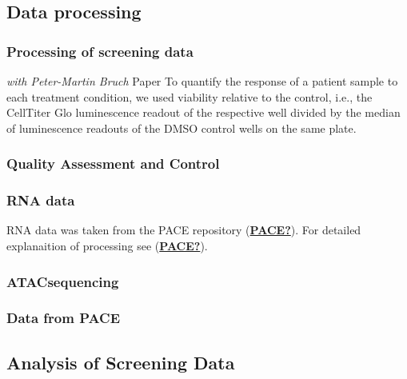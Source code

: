 \documentclass[11pt, a4paper, twosided]{book}
\begin{document}
\hypertarget{data-processing}{%
\subsection{Data processing}\label{data-processing}}

\hypertarget{processing-of-screening-data}{%
\subsubsection{Processing of screening data}\label{processing-of-screening-data}}

\emph{with Peter-Martin Bruch} Paper
To quantify the response of a patient sample to each treatment condition, we used viability relative to the control, i.e., the CellTiter Glo luminescence readout of the respective well divided by the median of luminescence readouts of the DMSO control wells on the same plate.

\hypertarget{quality-assessment-and-control}{%
\subsubsection{Quality Assessment and Control}\label{quality-assessment-and-control}}

\hypertarget{rna-data}{%
\subsubsection{RNA data}\label{rna-data}}

RNA data was taken from the PACE repository (\protect\hyperlink{ref-PACE}{\textbf{PACE?}}). For detailed explanaition of processing see (\protect\hyperlink{ref-PACE}{\textbf{PACE?}}).

\hypertarget{atacsequencing-1}{%
\subsubsection{ATACsequencing}\label{atacsequencing-1}}

\hypertarget{data-from-pace}{%
\subsubsection{Data from PACE}\label{data-from-pace}}

\hypertarget{analysis-of-screening-data}{%
\subsection{Analysis of Screening Data}\label{analysis-of-screening-data}}
\end{document}
